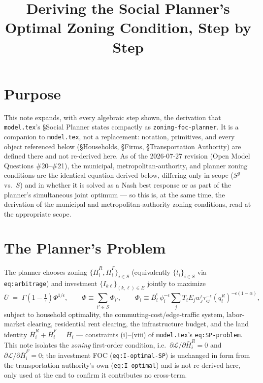 \documentclass[12pt, a4paper]{article}
\title{Deriving the Social Planner's Optimal Zoning Condition, Step by Step}
\author{}
\date{}
\theoremstyle{definition}
\begin{document}
\maketitle

\section*{Purpose}

This note expands, with every algebraic step shown, the derivation that \texttt{model.tex}'s \S Social Planner states compactly as \texttt{zoning-foc-planner}. It is a companion to \texttt{model.tex}, not a replacement: notation, primitives, and every object referenced below (\S Households, \S Firms, \S Transportation Authority) are defined there and not re-derived here. As of the 2026-07-27 revision (Open Model Questions \#20--\#21), the municipal, metropolitan-authority, and planner zoning conditions are the identical equation derived below, differing only in scope ($S^g$ vs.\ $S$) and in whether it is solved as a Nash best response or as part of the planner's simultaneous joint optimum — so this is, at the same time, the derivation of the municipal and metropolitan-authority zoning conditions, read at the appropriate scope.

\section*{The Planner's Problem}

The planner chooses zoning $\{\bar H_i^R,\bar H_i^F\}_{i\in S}$ (equivalently $\{t_i\}_{i\in S}$ via \texttt{eq:arbitrage}) and investment $\{I_{k\ell}\}_{(k,\ell)\in E}$ jointly to maximize
\[
\bar U \;=\; \Gamma\!\left(1-\tfrac1\epsilon\right)\Phi^{1/\epsilon}, \qquad \Phi\equiv\sum_{i'\in S}\Phi_{i'}, \qquad \Phi_i\equiv \bar B_i^\epsilon\,\phi_i^{-\epsilon}\sum_j T_iE_jw_j^\epsilon\tau_{ij}^{-\epsilon}(q_i^R)^{-\epsilon(1-\alpha)},
\]
subject to household optimality, the commuting-cost/edge-traffic system, labor-market clearing, residential rent clearing, the infrastructure budget, and the land identity $\bar H_i^R+\bar H_i^F=\bar H_i$ — constraints (i)--(viii) of \texttt{model.tex}'s \texttt{eq:SP-problem}. This note isolates the \emph{zoning} first-order condition, i.e.\ $\partial\mathcal L/\partial \bar H_i^R=0$ and $\partial\mathcal L/\partial \bar H_i^F=0$; the investment FOC (\texttt{eq:I-optimal-SP}) is unchanged in form from the transportation authority's own (\texttt{eq:I-optimal}) and is not re-derived here, only used at the end to confirm it contributes no cross-term.
\end{document}
